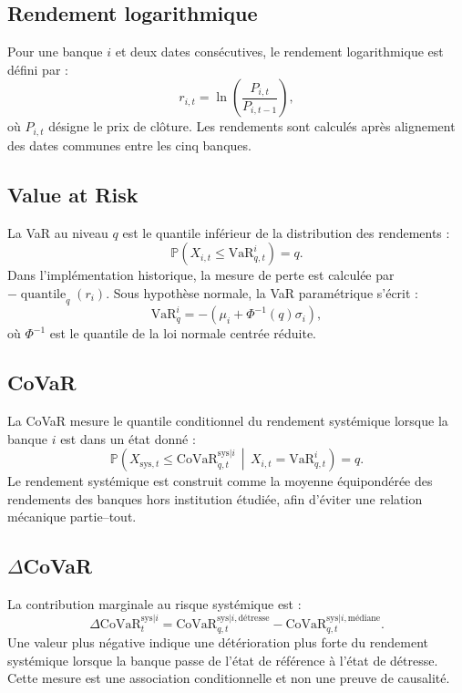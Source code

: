 \documentclass[12pt,a4paper]{article}
\begin{document}
\subsection{Rendement logarithmique}

Pour une banque $i$ et deux dates consécutives, le rendement logarithmique est défini par :
\[
  r_{i,t}=\ln\left(\frac{P_{i,t}}{P_{i,t-1}}\right),
\]
où $P_{i,t}$ désigne le prix de clôture. Les rendements sont calculés après alignement des dates
communes entre les cinq banques.

\subsection{Value at Risk}

La VaR au niveau $q$ est le quantile inférieur de la distribution des rendements :
\[
  \mathbb{P}\left(X_{i,t}\leq \mathrm{VaR}_{q,t}^{i}\right)=q.
\]
Dans l'implémentation historique, la mesure de perte est calculée par
$-\operatorname{quantile}_q(r_i)$. Sous hypothèse normale, la VaR paramétrique s'écrit :
\[
  \mathrm{VaR}_{q}^{i}
  =-\left(\mu_i+\Phi^{-1}(q)\sigma_i\right),
\]
où $\Phi^{-1}$ est le quantile de la loi normale centrée réduite.

\subsection{CoVaR}

La CoVaR mesure le quantile conditionnel du rendement systémique lorsque la banque $i$ est dans
un état donné :
\[
  \mathbb{P}\left(
  X_{\mathrm{sys},t}\leq
  \mathrm{CoVaR}_{q,t}^{\mathrm{sys}|i}
  \,\middle|\,
  X_{i,t}=\mathrm{VaR}_{q,t}^{i}
  \right)=q.
\]
Le rendement systémique est construit comme la moyenne équipondérée des rendements des banques
hors institution étudiée, afin d'éviter une relation mécanique partie--tout.

\subsection{\texorpdfstring{$\Delta$CoVaR}{Delta CoVaR}}

La contribution marginale au risque systémique est :
\[
  \Delta\mathrm{CoVaR}_{t}^{\mathrm{sys}|i}
  =
  \mathrm{CoVaR}_{q,t}^{\mathrm{sys}|i,\text{détresse}}
  -
  \mathrm{CoVaR}_{q,t}^{\mathrm{sys}|i,\text{médiane}}.
\]
Une valeur plus négative indique une détérioration plus forte du rendement systémique lorsque
la banque passe de l'état de référence à l'état de détresse. Cette mesure est une association
conditionnelle et non une preuve de causalité.
\end{document}
